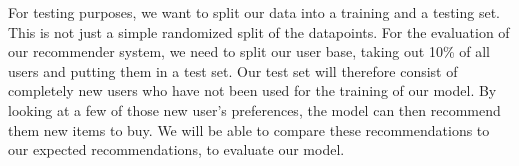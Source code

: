 \documentclass[11pt]{article}
\begin{document}
For testing purposes, we want to split our data into a training and a testing set. This is not just a simple randomized split of the datapoints. For the evaluation of our recommender system, we need to split our user base, taking out 10\% of all users and putting them in a test set. Our test set will therefore consist of completely new users who have not been used for the training of our model. By looking at a few of those new user's preferences, the model can then recommend them new items to buy. We will be able to compare these recommendations to our expected recommendations, to evaluate our model.
\end{document}
